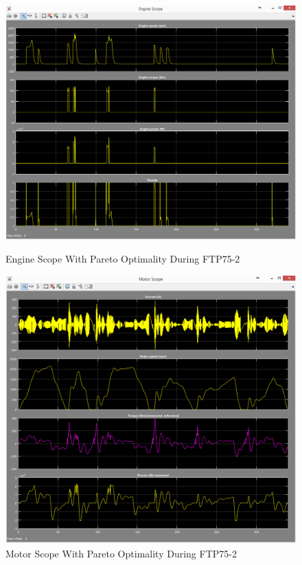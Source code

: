 \begin{figure}[hp]
\centering
\includegraphics[scale=0.45]{figures/Pareto/FTP75-2/engine03Juli}
\caption{Engine Scope With Pareto Optimality During FTP75-2}
\label{fig:epo2}
\includegraphics[scale=0.48]{figures/Pareto/FTP75-2/motor03Juli}
\caption{Motor Scope With Pareto Optimality During FTP75-2}
\label{fig:mpo2}
\end{figure}

